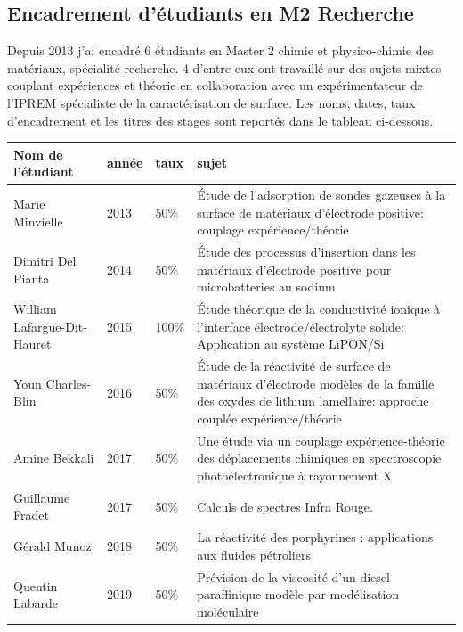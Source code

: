 \documentclass[11pt]{artuppax}
\newcounter{subsec}[section]
\begin{document}
\subsection{Encadrement d'étudiants en M2 Recherche}

Depuis 2013 j'ai encadré 6 étudiants en Master 2 chimie et physico-chimie des matériaux,
spécialité recherche. 4 d'entre eux ont travaillé sur des sujets mixtes couplant expériences
et théorie en collaboration avec un expérimentateur de l'IPREM spécialiste de la caractérisation de
surface. Les noms, dates, taux d'encadrement et les titres des stages sont reportés
dans le tableau ci-dessous.


{
\renewcommand{\arraystretch}{1.5}
\begin{tabularx}{\textwidth}{lllX}
\hline
Nom de l'étudiant & année & taux & sujet \\
\hline
Marie Minvielle & 2013 & 50\% & Étude de l'adsorption de sondes gazeuses à la surface de
                                matériaux d'électrode positive: couplage expérience/théorie \\
Dimitri Del Pianta & 2014 & 50\% & Étude des processus d'insertion dans les matériaux
                                   d'électrode positive pour microbatteries au sodium \\
William Lafargue-Dit-Hauret & 2015 & 100\% & Étude théorique de la conductivité ionique à
                                     l'interface
                                     électrode/électrolyte solide: Application au système
                                     LiPON/Si\\
Youn Charles-Blin & 2016 & 50\% & Étude de la réactivité de surface de matériaux d'électrode
                                  modèles de la famille des oxydes de lithium lamellaire:
                                  approche couplée expérience/théorie\\
Amine Bekkali & 2017 & 50\% & Une étude via un couplage expérience-théorie des déplacements
                              chimiques en spectroscopie photoélectronique à rayonnement X\\
Guillaume Fradet & 2017 & 50\% & Calculs de spectres Infra Rouge.\\
Gérald Munoz & 2018 & 50\% & La réactivité des porphyrines : applications aux fluides pétroliers\\
Quentin Labarde & 2019 & 50\% & Prévision de la viscosité d'un diesel paraffinique modèle par modélisation moléculaire\\
\hline
\end{tabularx}
}
\end{document}
